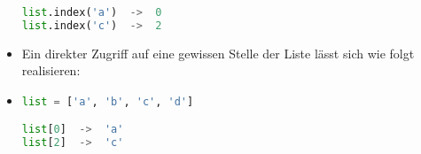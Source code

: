 \documentclass{article}
\begin{document}
\begin{itemize}
\begin{lstlisting}[language=Python]
list.index('a')  ->  0
list.index('c')  ->  2
		\end{lstlisting}
		\item[] Ein direkter Zugriff auf eine gewissen Stelle der Liste lässt sich wie folgt realisieren:
		\item[] \begin{lstlisting}[language=Python]
list = ['a', 'b', 'c', 'd']

list[0]	 ->  'a'
list[2]	 ->  'c'
		\end{lstlisting}
	\end{itemize}
\end{document}
